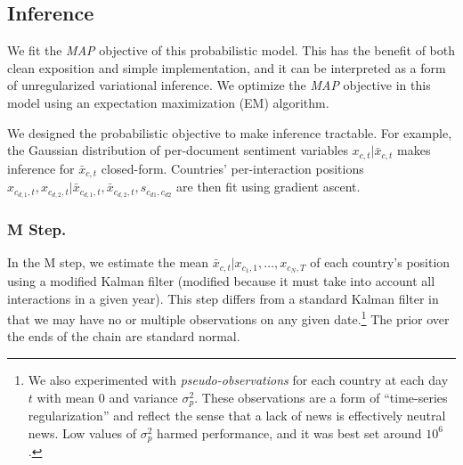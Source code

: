 
\subsection{Inference}
We fit the \emph{MAP} objective of this probabilistic model.  This has
the benefit of both clean exposition and simple implementation, and it
can be interpreted as a form of unregularized variational inference.
We optimize the \emph{MAP} objective in this model using an
expectation maximization (EM) algorithm.

We designed the probabilistic objective to make inference tractable.
For example, the Gaussian distribution of per-document sentiment
variables $x_{c, t} | \bar x_{c,t}$ makes inference for $\bar x_{c,t}$
closed-form.  Countries' per-interaction positions $x_{c_{d,1}, t},
x_{c_{d,2},t} | \bar x_{c_{d,1},t}, \bar x_{c_{d,2}, t}, s_{c_{d1},
  c_{d2}}$ are then fit using gradient ascent.

\subsubsection{M Step.} In the M step, we estimate the mean $\bar
x_{c,t} | x_{c_1,1}, \ldots, x_{c_N,T}$ of each country's position
using a modified Kalman filter (modified because it must take into
account all interactions in a given year).  This step differs from a
standard Kalman filter in that we may have no or multiple observations
on any given date.\footnote{We also experimented with
  \emph{pseudo-observations} for each country at each day $t$ with
  mean 0 and variance $\sigma_p^2$.  These observations are a form of
  ``time-series regularization'' and reflect the sense that a lack of
  news is effectively neutral news.  Low values of $\sigma_p^2$ harmed
  performance, and it was best set around $10^6$.}  The prior over the
ends of the chain are standard normal.

